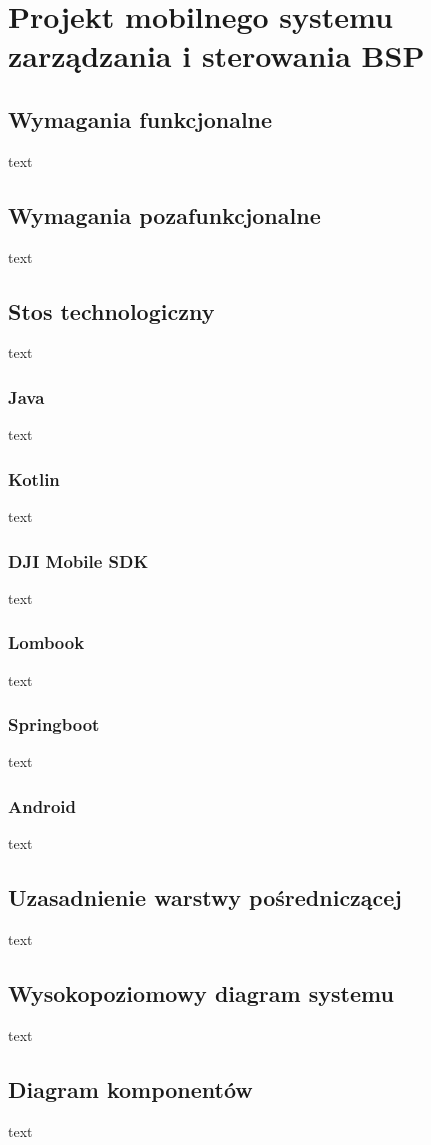 \newpage
\section{Projekt mobilnego systemu zarządzania i sterowania BSP}
\subsection{Wymagania funkcjonalne}
text
\subsection{Wymagania pozafunkcjonalne}
text
\subsection{Stos technologiczny}
text
\subsubsection{Java}
text
\subsubsection{Kotlin}
text
\subsubsection{DJI Mobile SDK}
text
\subsubsection{Lombook}
text
\subsubsection{Springboot}
text
\subsubsection{Android}
text
\subsection{Uzasadnienie warstwy pośredniczącej}
text
\subsection{Wysokopoziomowy diagram systemu}
text
\subsection{Diagram komponentów}
text
